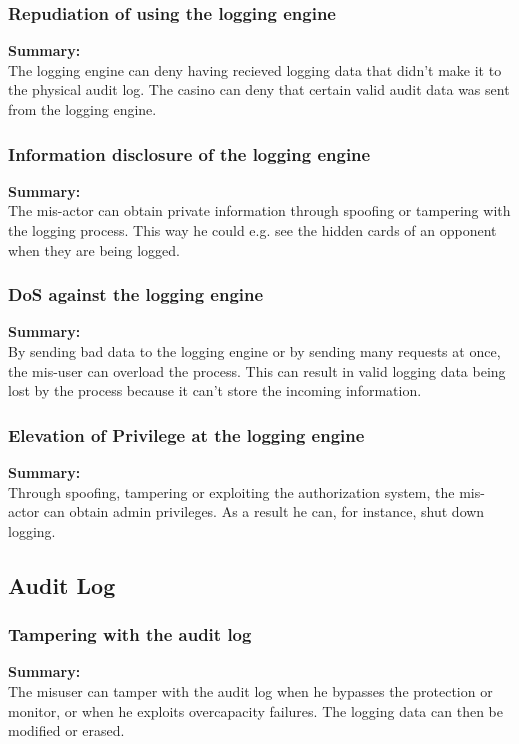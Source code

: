 \documentclass[a4paper,11pt]{report}
\begin{document}
\subsubsection{Repudiation of using the logging engine}
\label{LoggingEngineCasesR}
\textbf{Summary:} \\
The logging engine can deny having recieved logging data that didn't make it to the physical audit log. The casino can deny that certain valid audit data was sent from the logging engine.

\subsubsection{Information disclosure of the logging engine}
\label{LoggingEngineCasesI}
\textbf{Summary:} \\
The mis-actor can obtain private information through spoofing or tampering with the logging process. This way he could e.g. see the hidden cards of an opponent when they are being logged.

\subsubsection{DoS against the logging engine}
\label{LoggingEngineCasesD}
\textbf{Summary:} \\
By sending bad data to the logging engine or by sending many requests at once, the mis-user can overload the process. This can result in valid logging data being lost by the process because it can't store the incoming information.

\subsubsection{Elevation of Privilege at the logging engine}
\label{LoggingEngineCasesE}
\textbf{Summary:} \\
Through spoofing, tampering or exploiting the authorization system, the mis-actor can obtain admin privileges. As a result he can, for instance, shut down logging.

\subsection{Audit Log}
\label{AuditLogCases}

\subsubsection{Tampering with the audit log}
\label{AuditLogCasesT}
\textbf{Summary:} \\
The misuser can tamper with the audit log when he bypasses the protection or monitor, or when he exploits overcapacity failures. The logging data can then be modified or erased.
\end{document}
